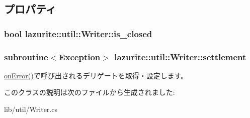 \subsection{プロパティ}
\hypertarget{classlazurite_1_1util_1_1_writer_aad2ddbf9b2441adcdb7913e6cd85fe46}{
\subsubsection[{is\_\-closed}]{\setlength{\rightskip}{0pt plus 5cm}bool lazurite::util::Writer::is\_\-closed}}
\label{classlazurite_1_1util_1_1_writer_aad2ddbf9b2441adcdb7913e6cd85fe46}
\hypertarget{classlazurite_1_1util_1_1_writer_a2a39a19e6fb9262f37b27be31b5a45c3}{
\subsubsection[{settlement}]{\setlength{\rightskip}{0pt plus 5cm}subroutine$<$Exception$>$ lazurite::util::Writer::settlement}}
\label{classlazurite_1_1util_1_1_writer_a2a39a19e6fb9262f37b27be31b5a45c3}


\hyperlink{classlazurite_1_1util_1_1_writer_ae0505d0da349d6009401b33e55b08bc4}{onError()}で呼び出されるデリゲートを取得・設定します。 

このクラスの説明は次のファイルから生成されました:\begin{DoxyCompactItemize}
\item 
lib/util/Writer.cs\end{DoxyCompactItemize}
